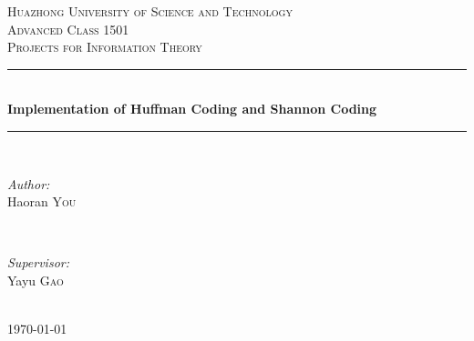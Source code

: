 \documentclass[12pt]{article} %
\numberwithin{equation}{section}
\begin{document}

\begin{titlepage}

\newcommand{\HRule}{\rule{\linewidth}{0.5mm}}
\center

\textsc{\LARGE Huazhong University of Science and Technology}\\[1.5cm]
\textsc{\Large Advanced Class 1501}\\[0.5cm]
\textsc{\Large Projects for Information Theory}\\[1.2cm]

\HRule \\[0.4cm]
{ \huge \bfseries Implementation of Huffman Coding and Shannon Coding}\\[0.4cm]
\HRule \\[1.5cm]

\begin{minipage}{0.4\textwidth}
\begin{flushleft} \large
\emph{Author:}\\
Haoran \textsc{You} %
\end{flushleft}
\end{minipage}
~
\begin{minipage}{0.4\textwidth}
\begin{flushright} \large
\emph{Supervisor:} \\
Yayu \textsc{Gao} %
\end{flushright}
\end{minipage}\\[4cm]

{\large \today}\\[3cm]


\vfill

\end{titlepage}


\tableofcontents

\newpage

\end{document}
